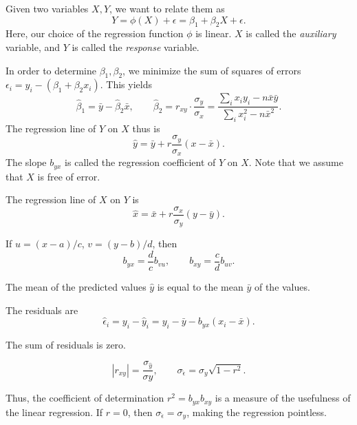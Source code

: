 \documentclass[11pt]{article}
\theoremstyle{definition}
\theoremstyle{remark}
\numberwithin{equation}{section}
\begin{document}
    Given two variables $X, Y$, we want to relate them as \[
        Y = \phi(X) + \epsilon = \beta_1 + \beta_2X + \epsilon.
    \] Here, our choice of the regression function $\phi$ is linear. $X$ is called
    the \emph{auxiliary} variable, and $Y$ is called the \emph{response} variable.

    In order to determine $\beta_1, \beta_2$, we minimize the sum of squares of
    errors $\epsilon_i = y_i - (\beta_1 + \beta_2x_i)$. This yields \[
        \hat{\beta}_1 = \bar{y} - \hat{\beta}_2\bar{x}, \qquad
        \hat{\beta}_2 = r_{xy} \cdot \frac{\sigma_y}{\sigma_x} = \frac{\sum_i x_iy_i
        - n\bar{x}\bar{y}}{\sum_i x_i^2 - n\bar{x}^2}.
    \] The regression line of $Y$ on $X$ thus is \[
        \hat{y} = \bar{y} + r\frac{\sigma_y}{\sigma_x}(x - \bar{x}).
    \] The slope $b_{yx}$ is called the regression coefficient of $Y$ on $X$. Note
    that we assume that $X$ is free of error.

    The regression line of $X$ on $Y$ is \[
        \hat{x} = \bar{x} + r\frac{\sigma_x}{\sigma_y}(y - \bar{y}).
    \] 

    \begin{lemma}
        If $u = (x - a) / c$, $v = (y - b) / d$, then \[
            b_{yx} = \frac{d}{c}b_{vu}, \qquad
            b_{xy} = \frac{c}{d}b_{uv}.
        \] 
    \end{lemma}

    \begin{lemma}
        The mean of the predicted values $\hat{y}$ is equal to the mean $\bar{y}$ of
        the values.
    \end{lemma}

    The residuals are \[
        \hat{\epsilon}_i = y_i - \hat{y}_i = y_i - \bar{y} - b_{yx}(x_i - \bar{x}).
    \] 

    \begin{lemma}
        The sum of residuals is zero.
    \end{lemma}

    \begin{lemma}
        \[
            |r_{xy}| = \frac{\sigma_{\hat{y}}}{\sigma{y}}, \qquad
            \sigma_{\hat{\epsilon}} = \sigma_y\sqrt{1 - r^2}.
        \] 
    \end{lemma}

    Thus, the coefficient of determination $r^2 = b_{yx}b_{xy}$ is a measure of the
    usefulness of the linear regression. If $r = 0$, then $\sigma_{\hat{\epsilon}} =
    \sigma_y$, making the regression pointless.
\end{document}
